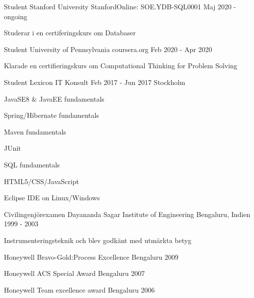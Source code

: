 \documentclass[12pt, a4paper]{awesome-cv}
\begin{document}

  \begin{cventries}
    \cventry
    {Student}
      {Stanford University}
      {StanfordOnline: SOE.YDB-SQL0001}
      {Maj 2020 - ongoing}
      {
        \begin{cvitems}
        \item {Studerar i en certiferingskurs om Databaser}
        \end{cvitems}
      }

    \cventry
      {Student}
      {University of Pennsylvania}
      {coursera.org}
      {Feb 2020 - Apr 2020}
      {
        \begin{cvitems}
        \item {Klarade en certifieringskurs om Computational Thinking for Problem Solving}
        \end{cvitems}
      }

    \cventry
      {Student}
      {Lexicon IT Konsult}
      {Feb 2017 - Jun 2017}
      {Stockholm}
      {
        \begin{cvitems}
          \item JavaSE8 \& JavaEE fundamentals
          \item Spring/Hibernate fundamentals
          \item Maven fundamentals
          \item JUnit
          \item SQL fundamentals
          \item HTML5/CSS/JavaScript
          \item Eclipse IDE on Linux/Windows
           \end{cvitems}
      }
    \end{cventries}

    \begin{cventries}
    \cventry
        {Civilingenjörexamen}
        {Dayananda Sagar Institute of Engineering}
        {Bengaluru, Indien}
        {1999 - 2003}
        {
            \begin{cvitems}
            \item {Instrumenteringsteknik och blev godkänt med utmärkta betyg}
            \end{cvitems}
        }
  \end{cventries}

  \begin{cvhonors}

      \cvhonor
      {Honeywell}
      {Bravo-Gold:Process Excellence}
      {Bengaluru}
      {2009}

      \cvhonor
      {Honeywell}
      {ACS Special Award}
      {Bengaluru}
      {2007}

      \cvhonor
      {Honeywell}
      {Team excellence award}
      {Bengaluru}
      {2006}
  \end{cvhonors}
\end{document}
